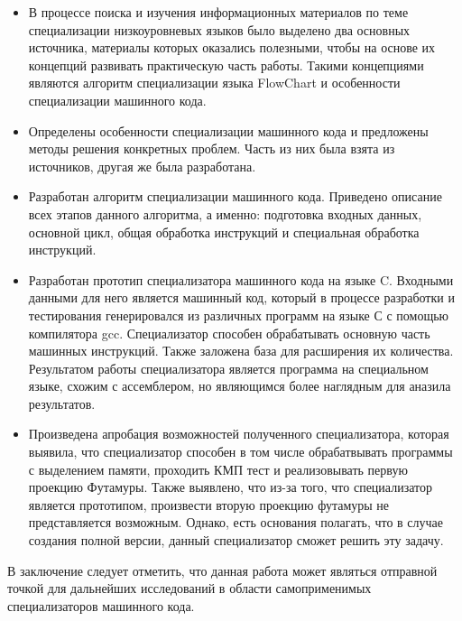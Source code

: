 \documentclass{spbau-diploma}
\begin{document}
\begin{itemize}
\item В процессе поиска и изучения информационных материалов по теме специализации низкоуровневых языков было выделено два основных источника, материалы которых оказались полезными, чтобы на основе их концепций развивать практическую часть работы. Такими концепциями являются алгоритм специализации языка FlowChart и особенности специализации машинного кода.
\item Определены особенности специализации машинного кода и предложены методы решения конкретных проблем. Часть из них была взята из источников, другая же была разработана.
\item Разработан алгоритм специализации машинного кода. Приведено описание всех этапов данного алгоритма, а именно: подготовка входных данных, основной цикл, общая обработка инструкций и специальная обработка инструкций.
\item Разработан прототип специализатора машинного кода на языке C. Входными данными для него является машинный код, который в процессе разработки и тестирования генерировался из различных программ на языке С с помощью компилятора gcc. Специализатор способен обрабатывать основную часть машинных инструкций. Также заложена база для расширения их количества. Результатом работы специализатора является программа на специальном языке, схожим с ассемблером, но являющимся более наглядным для аназила результатов. 
\item Произведена апробация возможностей полученного специализатора, которая выявила, что специализатор способен в том числе обрабатвывать программы с выделением памяти, проходить КМП тест и реализовывать первую проекцию Футамуры. Также выявлено, что из-за того, что специализатор является прототипом, произвести вторую проекцию футамуры не представляется возможным. Однако, есть основания полагать, что в случае создания полной версии, данный специализатор сможет решить эту задачу.

\end{itemize}

В заключение следует отметить, что данная работа может являться отправной точкой для дальнейших исследований в области самоприменимых специализаторов машинного кода.


\end{document}
